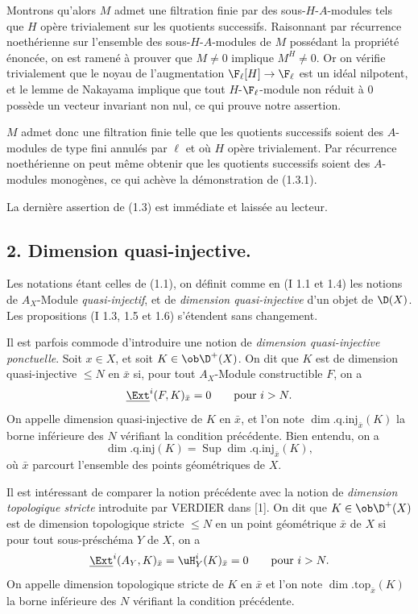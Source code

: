 Montrons qu'alors $M$ admet une filtration finie par des sous-$H$-$A$-modules tels que $H$ opère trivialement sur les quotients successifs. Raisonnant par récurrence noethérienne sur l'ensemble des sous-$H$-$A$-modules de $M$ possédant la propriété énoncée, on est ramené à prouver que $M\neq0$ implique $M^H\neq0$. Or on vérifie trivialement que le noyau de l'augmentation $\F_\ell[H]\to\F_\ell$ est un idéal nilpotent, et le lemme de Nakayama implique que tout $H$-$\F_\ell$-module non réduit à $0$ possède un vecteur invariant non nul, ce qui prouve notre assertion.

$M$ admet donc une filtration finie telle que les quotients successifs soient des $A$-modules de type fini annulés par $\ell$ et où $H$ opère trivialement. Par récurrence noethérienne on peut même obtenir que les quotients successifs soient des $A$-modules monogènes, ce qui achève la démonstration de (1.3.1).

La dernière assertion de (1.3) est immédiate et laissée au lecteur.

\subsection*{2. Dimension quasi-injective.}

Les notations étant celles de (1.1), on définit comme en (I 1.1 et 1.4) les notions de $A_X$-Module \emph{quasi-injectif}, et de \emph{dimension quasi-injective} d'un objet de $\D(X)$. Les propositions (I 1.3, 1.5 et 1.6) s'étendent sans changement.

Il est parfois commode d'introduire une notion de \emph{dimension quasi-injective ponctuelle}. Soit $x\in X$, et soit $K\in\ob \D^+(X)$. On dit que $K$ est de dimension quasi-injective $\leq N$ en $\bar{x}$ si, pour tout $A_X$-Module constructible $F$, on a
\[
        \underline{\Ext}^{i}(F,K)_{\bar{x}}=0\qquad\hbox{pour }i>N.
\]
On appelle dimension quasi-injective de $K$ en $\bar{x}$, et l'on note $\dim.\mathrm{q.inj}_{\bar{x}}(K)$ la borne inférieure des $N$ vérifiant la condition précédente. Bien entendu, on a
\[
        \dim.\mathrm{q.inj}(K)=\operatorname{Sup}\dim.\mathrm{q.inj}_{\bar{x}}(K),
\]
où $\bar{x}$ parcourt l'ensemble des points géométriques de $X$.

Il est intéressant de comparer la notion précédente avec la notion de \emph{dimension topologique stricte} introduite par VERDIER dans [1]. On dit que $K\in\ob \D^+(X)$ est de dimension topologique stricte $\leq N$ en un point géométrique $\bar{x}$ de $X$ si pour tout sous-préschéma $Y$ de $X$, on a
\[
        \underline{\Ext}^{i}(A_Y,K)_{\bar{x}}=\uH^i_Y(K)_{\bar{x}}=0\qquad\hbox{pour }i>N.
\]
On appelle dimension topologique stricte de $K$ en $\bar{x}$ et l'on note $\dim.\mathrm{top}_{\bar{x}}(K)$ la borne inférieure des $N$ vérifiant la condition précédente.

